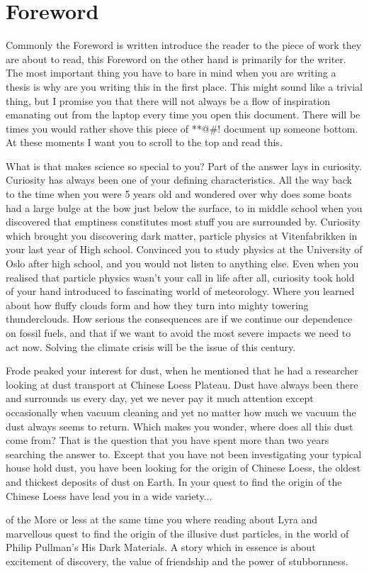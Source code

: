 \chapter*{Foreword}
Commonly the Foreword is written introduce the reader to the piece of work they are about to read, this Foreword on the other hand is primarily for the writer. The most important thing you have to bare in mind when you are writing a thesis is why are you writing this in the first place. This might sound like a trivial thing, but I promise you that there will not always be a flow of inspiration emanating out from the laptop every time you open this document. There will be times you would rather shove this piece of **@\#! document up someone bottom. At these moments I want you to scroll to the top and read this.

What is that makes science so special to you? Part of the answer lays in curiosity. Curiosity has always been one of your defining characteristics. All the way back to the time when you were 5 years old and wondered over why does some boats had a large bulge at the bow just below the surface, to in middle school when you discovered that emptiness constitutes most stuff you are surrounded by. Curiosity which brought you discovering dark matter, particle physics at Vitenfabrikken in your last year of High school. Convinced you to study physics at the University of Oslo after high school, and you would not listen to anything else. Even when you realised that particle physics wasn't your call in life after all, curiosity took hold of your hand introduced to fascinating world of meteorology. Where you learned about how fluffy clouds form and how they turn into mighty towering thunderclouds. How serious the consequences are if we continue our dependence on fossil fuels, and that if we want to avoid the most severe impacts we need to act now. Solving the climate crisis will be the issue of this century. \par Frode peaked your interest for dust, when he mentioned that he had a researcher looking at dust transport at Chinese Loess Plateau. Dust have always been there and surrounds us every day, yet we never pay it much attention except occasionally when vacuum cleaning and yet no matter how much we vacuum the dust always seems to return. Which makes you wonder, where does all this dust come from? That is the question that you have spent more than two years searching the answer to. Except that you have not been investigating your typical house hold dust, you have been looking for the origin of Chinese Loess, the oldest and thickest deposits of dust on Earth. In your quest to find the origin of the Chinese Loess have lead you in a wide variety... 

of the More or less at the same time you where reading about Lyra and marvellous quest to find the origin of the illusive dust particles, in the world of Philip Pullman's His Dark Materials. A story which in essence is about excitement of discovery, the value of friendship and the power of stubbornness.     